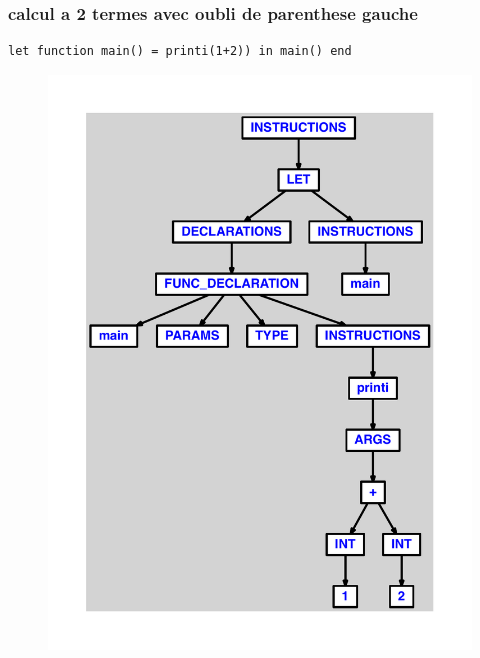 \documentclass{article}
\begin{document}
\subsubsection{calcul a 2 termes avec oubli de parenthese gauche}
\begin{lstlisting}
let function main() = printi(1+2)) in main() end
\end{lstlisting}
\newpage
\begin{figure}[H]
\centering
\includegraphics[max width=\textwidth]{ast/ast_27.pdf}
\end{figure}
\newpage
\end{document}
